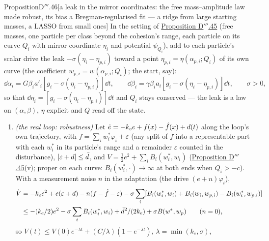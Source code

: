 \begin{thm}{Proposition}{D$'''$.46}[a leak in the mirror coordinates: the free mass--amplitude law made robust, its bias
a Bregman-regularised fit --- a ridge from large starting masses, a LASSO from small
ones]\label{res:thmDppp:46}%
In the setting of \hyperref[res:thmDppp:45]{Proposition D$'''$.45} (free masses, one particle per class beyond the
cohesion's range, each particle on its curve $Q_i$ with mirror coordinate $\eta_i$ and potential $\psi_{Q_i}$), add to
each particle's scalar drive the leak $-\sigma(\eta_i - \eta_{p,i})$ toward a point
$\eta_{p,i} = \eta(\alpha_{p,i};Q_i)$ of its own curve (the coefficient $w_{p,i} = w(\alpha_{p,i};Q_i)$; the start,
say):
\[
  \dd\alpha_i = G\beta_ia'_i[g_i - \sigma(\eta_i - \eta_{p,i})]\dd t,\qquad
  \dd\beta_i = \gamma\beta_ia_i[g_i - \sigma(\eta_i - \eta_{p,i})]\dd t,\qquad \sigma > 0,
\]
so that $\dd\eta_i = [g_i - \sigma(\eta_i - \eta_{p,i})]\dd t$ and $Q_i$ stays conserved --- the leak is a law on
$(\alpha,\beta)$, $\eta$ explicit and $Q$ read off the state.
\begin{enumerate}[label=\textup{(\roman*)}]
  \item \emph{(the real loop: robustness)} Let $\dot e = -k_ee + f(x) - \hat f(x) + d(t)$ along the loop's own
    trajectory, with $f = \sum_iw^*_i\varphi_i + \varepsilon$ (any split of $f$ into a representable part with each
    $w^*_i$ in its particle's range and a remainder $\varepsilon$ counted in the disturbance),
    $\lvert \varepsilon + d\rvert\le\bar d$, and $V = \tfrac12e^2 + \sum_iB_i(w^*_i,w_i)$
    (\hyperref[res:thmDppp:45]{Proposition D$'''$.45}(v); proper on each curve: $B_i(w^*_i,\cdot)\to\infty$ at both ends
    when $Q_i > -c$). With a measurement noise $n$ in the adaptation (the drive $(e + n)\varphi_i$),
    \begin{align*}
      \dot V &= -k_ee^2 + e(\varepsilon + d) - n(f - \hat f - \varepsilon)
      - \sigma\sum_i[B_i(w^*_i,w_i) + B_i(w_i,w_{p,i}) - B_i(w^*_i,w_{p,i})]\\
      &\le -(k_e/2)e^2 - \sigma\sum_iB_i(w^*_i,w_i) + \bar d^2/(2k_e) + \sigma B(w^*,w_p)\qquad(n = 0),
    \end{align*}
    so $V(t)\le V(0)e^{-\lambda t} + (C/\lambda)(1 - e^{-\lambda t})$, $\lambda = \min(k_e,\sigma)$,

\end{enumerate}
\end{thm}
